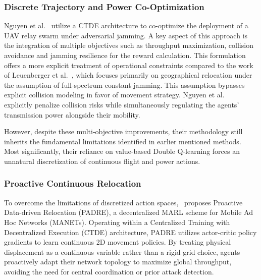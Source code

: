 \documentclass[journal]{IEEEtran}
\newcommand{\adm}[1]{{\color{orange}{[#1]}}}
\begin{document}
\subsubsection{Discrete Trajectory and Power Co-Optimization}
Nguyen et al.~\cite{Nguyen2025_MARL_UAVRelay} utilize a CTDE architecture to co-optimize the deployment of a UAV relay swarm under adversarial jamming.
A key aspect of this approach is the integration of multiple objectives such as throughput maximization, collision avoidance and jamming resilience for the reward calculation.
This formulation offers a more explicit treatment of operational constraints compared to the work of Leuenberger et al.~\cite{11302544}, which focuses primarily on geographical relocation under the assumption of full-spectrum constant jamming.
This assumption bypasses explicit collision modeling in favor of movement strategy.
Nguyen et al.~\cite{Nguyen2025_MARL_UAVRelay} explicitly penalize collision risks while simultaneously regulating the agents' transmission power alongside their mobility.

However, despite these multi-objective improvements, their methodology still inherits the fundamental limitations identified in earlier mentioned methods. 
Most significantly, their reliance on value-based Double Q-learning forces an unnatural discretization of continuous flight and power actions.

\subsubsection{Proactive Continuous Relocation}
To overcome the limitations of discretized action spaces,~\cite{11302544} proposes Proactive Data-driven Relocation (PADRE), a decentralized MARL scheme for Mobile Ad Hoc Networks (MANETs).
Operating within a Centralized Training with Decentralized Execution (CTDE) architecture, PADRE utilizes actor-critic policy gradients to learn continuous 2D movement policies.
By treating physical displacement as a continuous variable rather than a rigid grid choice, agents proactively adapt their network topology to maximize global throughput, avoiding the need for central coordination or prior attack detection.
\end{document}
